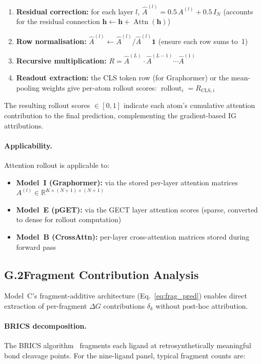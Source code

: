 \documentclass[11pt]{article}
\begin{document}
\begin{enumerate}[leftmargin=1.5em]
  \item \textbf{Residual correction:} for each layer $l$,
    $\hat{A}^{(l)} = 0.5\, A^{(l)} + 0.5\, I_N$
    (accounts for the residual connection $\mathbf{h} \leftarrow
    \mathbf{h} + \operatorname{Attn}(\mathbf{h})$)
  \item \textbf{Row normalisation:}
    $\hat{A}^{(l)} \leftarrow \hat{A}^{(l)} /
    \hat{A}^{(l)} \mathbf{1}$
    (ensure each row sums to~1)
  \item \textbf{Recursive multiplication:}
    $R = \hat{A}^{(L)} \cdot \hat{A}^{(L-1)}
    \cdots \hat{A}^{(1)}$
  \item \textbf{Readout extraction:} the CLS token row (for Graphormer)
    or the mean-pooling weights give per-atom rollout scores:
    $\operatorname{rollout}_i = R_{\mathrm{CLS}, i}$
\end{enumerate}

\noindent
The resulting rollout scores $\in [0, 1]$ indicate each atom's
cumulative attention contribution to the final prediction,
complementing the gradient-based IG attributions.

\paragraph{Applicability.}
Attention rollout is applicable to:
\begin{itemize}[leftmargin=1.5em]
  \item \textbf{Model~I (Graphormer):} via the stored per-layer
    attention matrices $A^{(l)} \in \mathbb{R}^{K \times (N+1) \times (N+1)}$
  \item \textbf{Model~E (pGET):} via the GECT layer attention scores
    (sparse, converted to dense for rollout computation)
  \item \textbf{Model~B (CrossAttn):} per-layer cross-attention
    matrices stored during forward pass
\end{itemize}

\subsection*{G.2\quad Fragment Contribution Analysis}

Model~C's fragment-additive architecture
(Eq.~\ref{eq:frag_pred}) enables direct extraction of per-fragment
$\Delta G$ contributions $\delta_k$ without post-hoc attribution.

\paragraph{BRICS decomposition.}
The BRICS algorithm~\cite{degen2008brics} fragments each ligand at
retrosynthetically meaningful bond cleavage points.
For the nine-ligand panel, typical fragment counts are:
\end{document}
